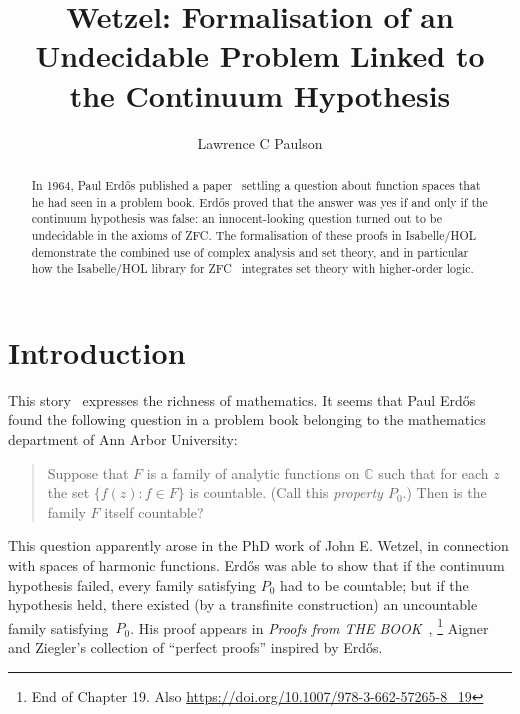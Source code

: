 \documentclass[runningheads]{llncs}
\begin{document}
%
\title{Wetzel: Formalisation of an Undecidable Problem Linked to the Continuum Hypothesis}
%
\author{Lawrence C Paulson}
%
%
%
\maketitle              %
%
\begin{abstract}
In 1964, Paul Erd\H{o}s published a paper~\cite{erdos-interpolation} settling a question about function spaces that he had seen in a problem book.
Erd\H{o}s proved that the answer was yes if and only if the continuum hypothesis was false:
an innocent-looking question turned out to be undecidable in the axioms of ZFC\@.
The formalisation of these proofs in Isabelle/HOL demonstrate the combined use of complex analysis and set theory, and in particular how the Isabelle/HOL library for ZFC~\cite{ZFC_in_HOL-AFP} integrates set theory with higher-order logic.
\end{abstract}


\section{Introduction}

This story~\cite{garcia-wetzels-problem} expresses the richness of mathematics.
It seems that Paul Erd\H{o}s found the following question in a problem book belonging to the mathematics department of Ann Arbor University:
\begin{quote}
Suppose that $F$ is a family of analytic functions on $\mathbb{C}$ such that for each $z$ the set $\{f (z): f\in F\}$ is countable. (Call this \emph{property $P_0$}.) Then is the family $F$ itself countable?
\end{quote}
This question apparently arose in the PhD work of John E. Wetzel, in connection with spaces of harmonic functions.
Erd\H{o}s was able to show that if the continuum hypothesis failed, every family satisfying $P_0$ had to be countable; but if the hypothesis held, there existed (by a transfinite construction) an uncountable family satisfying~$P_0$.
His proof appears in \textit{Proofs from THE BOOK}~\cite{aigner-proofs},%
\footnote{End of Chapter 19. Also  \url{https://doi.org/10.1007/978-3-662-57265-8_19}}
Aigner and Ziegler's collection of ``perfect proofs'' inspired by  Erd\H{o}s.
\end{document}
